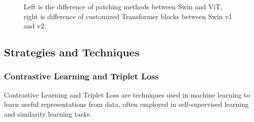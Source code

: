 \documentclass[10pt,twocolumn,letterpaper]{article}
\begin{document}
\begin{figure}[h]
	\centering
	\caption{Left is the difference of patching methods between Swin and ViT\cite{liu2021swin, dosovitskiy2020image}, right is difference of customized Transformer blocks between Swin v1 and v2\cite{liu2022swin, liu2021swin}.}
	\label{fig:swin}
\end{figure}

\subsection{Strategies and Techniques}
\label{method:tech}
\subsubsection{Contrastive Learning and Triplet Loss}
Contrastive Learning and Triplet Loss are techniques used in machine learning to learn useful representations from data, often employed in self-supervised learning and similarity learning tasks.\\
\end{document}
